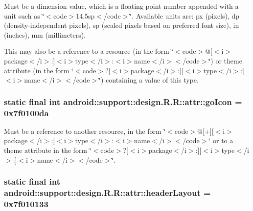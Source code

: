 Must be a dimension value, which is a floating point number appended with a unit such as \char`\"{}$<$code$>$14.5sp$<$/code$>$\char`\"{}. Available units are: px (pixels), dp (density-independent pixels), sp (scaled pixels based on preferred font size), in (inches), mm (millimeters). 

This may also be a reference to a resource (in the form \char`\"{}$<$code$>$@\mbox{[}$<$i$>$package$<$/i$>$:\mbox{]}$<$i$>$type$<$/i$>$:$<$i$>$name$<$/i$>$$<$/code$>$\char`\"{}) or theme attribute (in the form \char`\"{}$<$code$>$?\mbox{[}$<$i$>$package$<$/i$>$:\mbox{]}\mbox{[}$<$i$>$type$<$/i$>$:\mbox{]}$<$i$>$name$<$/i$>$$<$/code$>$\char`\"{}) containing a value of this type. \hypertarget{classandroid_1_1support_1_1design_1_1_r_1_1attr_b07ed97f6aa752246dabd5388b27f83b}{
\subsubsection[{goIcon}]{\setlength{\rightskip}{0pt plus 5cm}static final int android::support::design.R.R::attr::goIcon = 0x7f0100da}}
\label{classandroid_1_1support_1_1design_1_1_r_1_1attr_b07ed97f6aa752246dabd5388b27f83b}


Must be a reference to another resource, in the form \char`\"{}$<$code$>$@\mbox{[}+\mbox{]}\mbox{[}$<$i$>$package$<$/i$>$:\mbox{]}$<$i$>$type$<$/i$>$:$<$i$>$name$<$/i$>$$<$/code$>$\char`\"{} or to a theme attribute in the form \char`\"{}$<$code$>$?\mbox{[}$<$i$>$package$<$/i$>$:\mbox{]}\mbox{[}$<$i$>$type$<$/i$>$:\mbox{]}$<$i$>$name$<$/i$>$$<$/code$>$\char`\"{}. \hypertarget{classandroid_1_1support_1_1design_1_1_r_1_1attr_c549214b05d4c2c019110147f0e2ed84}{
\subsubsection[{headerLayout}]{\setlength{\rightskip}{0pt plus 5cm}static final int android::support::design.R.R::attr::headerLayout = 0x7f010133}}
\label{classandroid_1_1support_1_1design_1_1_r_1_1attr_c549214b05d4c2c019110147f0e2ed84}


